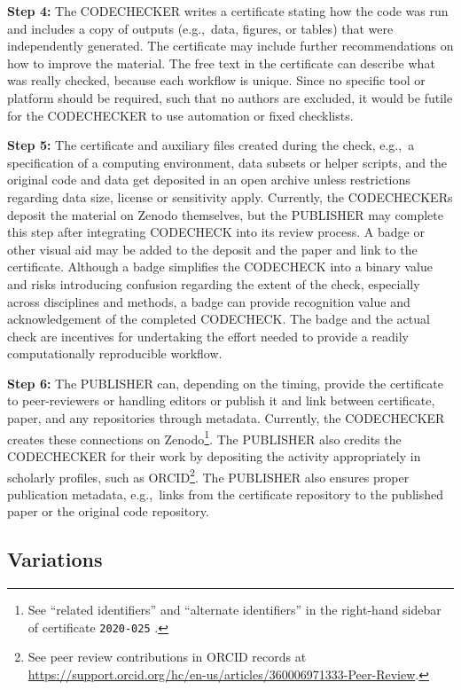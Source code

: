 \documentclass[12pt]{article}
\begin{document}
\textbf{Step 4:} The CODECHECKER writes a certificate stating how the
code was run and includes a copy of outputs (e.g.,~data, figures, or
tables) that were independently generated.  The certificate may
include further recommendations on how to improve the material.  The
free text in the certificate can describe what was really checked,
because each workflow is unique.  Since no specific tool or platform
should be required, such that no authors are excluded, it would be
futile for the CODECHECKER to use automation or fixed checklists.

\textbf{Step 5:} The certificate and auxiliary files created
during the check, e.g.,~a specification of a computing environment, data 
subsets or helper scripts, and the original code and data get deposited in
an open archive unless restrictions regarding data size, license or 
sensitivity apply.
Currently, the CODECHECKERs deposit the material on Zenodo themselves, but the PUBLISHER may complete this step after integrating CODECHECK into its review process.
A badge or other visual aid may be added to the deposit and the paper and
link to the certificate.
Although a badge simplifies the CODECHECK into a binary value and risks introducing confusion regarding the extent of the check, especially across disciplines and methods, a badge can provide recognition value and acknowledgement of the completed CODECHECK.
The badge and the actual check are incentives for undertaking the effort needed to provide a readily computationally reproducible workflow.

\textbf{Step 6:} The PUBLISHER can, depending on the timing, provide the
certificate to peer-reviewers or handling editors or publish it
and link between  certificate, paper, and any repositories 
through metadata. Currently, the CODECHECKER creates these connections on
Zenodo\footnote{
See ``related identifiers'' and ``alternate identifiers'' in the right-hand
sidebar of certificate \texttt{2020-025} \cite{cert-2020-025}.}.
The PUBLISHER also credits the CODECHECKER for their work by depositing
the activity appropriately in scholarly profiles, such as ORCID\footnote{
See peer review contributions in ORCID records at
\url{https://support.orcid.org/hc/en-us/articles/360006971333-Peer-Review}.}.
The PUBLISHER also ensures proper publication metadata, e.g.,~links from the 
certificate repository to the published paper or the original code repository.

\newpage

\subsection*{Variations}\label{variations}
\end{document}
